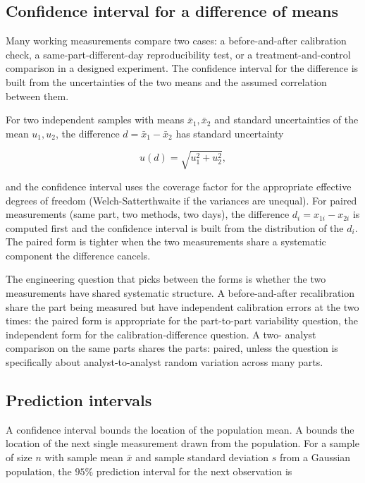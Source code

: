 \subsection{Confidence interval for a difference of means}

Many working measurements compare two cases: a before-and-after
calibration check, a same-part-different-day reproducibility test,
or a treatment-and-control comparison in a designed experiment. The
confidence interval for the difference is built from the
uncertainties of the two means and the assumed correlation between
them.

For two independent samples with means $\bar{x}_{1}, \bar{x}_{2}$
and standard uncertainties of the mean $u_{1}, u_{2}$, the
difference $d = \bar{x}_{1} - \bar{x}_{2}$ has standard uncertainty

\[
u(d) = \sqrt{u_{1}^{2} + u_{2}^{2}},
\]

and the confidence interval uses the coverage factor for the
appropriate effective degrees of freedom (Welch-Satterthwaite if the
variances are unequal). For paired measurements (same part, two
methods, two days), the difference $d_{i} = x_{1i} - x_{2i}$ is
computed first and the confidence interval is built from the
distribution of the $d_{i}$. The paired form is tighter when the
two measurements share a systematic component the difference
cancels.

The engineering question that picks between the forms is whether
the two measurements have shared systematic structure. A
before-and-after recalibration share the part being measured but
have independent calibration errors at the two times: the paired
form is appropriate for the part-to-part variability question, the
independent form for the calibration-difference question. A two-
analyst comparison on the same parts shares the parts: paired,
unless the question is specifically about analyst-to-analyst random
variation across many parts.

\subsection{Prediction intervals}

A confidence interval bounds the location of the population mean.
A  bounds the location of the next
single measurement drawn from the population. For a sample of size
$n$ with sample mean $\bar{x}$ and sample standard deviation $s$
from a Gaussian population, the $95\%$ prediction interval for the
next observation is

